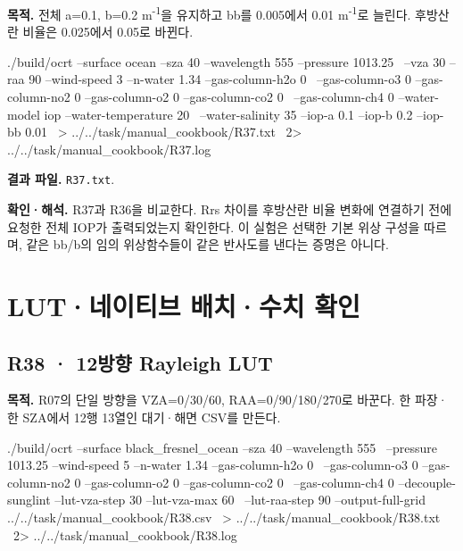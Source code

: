 \label{recipe:R37}

\textbf{목적. }전체 a=0.1, b=0.2 m\textsuperscript{-1}을 유지하고 bb를 0.005에서 0.01 m\textsuperscript{-1}로 늘린다. 후방산란 비율은 0.025에서 0.05로 바뀐다.

\noindent\begin{minipage}{\linewidth}
\begin{ManualCode}

./build/ocrt --surface ocean --sza 40 --wavelength 555 --pressure 1013.25 \
  --vza 30 --raa 90 --wind-speed 3 --n-water 1.34 --gas-column-h2o 0 \
  --gas-column-o3 0 --gas-column-no2 0 --gas-column-o2 0 --gas-column-co2 0 \
  --gas-column-ch4 0 --water-model iop --water-temperature 20 \
  --water-salinity 35 --iop-a 0.1 --iop-b 0.2 --iop-bb 0.01 \
  > ../../task/manual_cookbook/R37.txt \
  2> ../../task/manual_cookbook/R37.log

\end{ManualCode}
\end{minipage}\par

\textbf{결과 파일. }\texttt{R37.txt}.

\textbf{확인·해석. }R37과 R36을 비교한다. Rrs 차이를 후방산란 비율 변화에 연결하기 전에 요청한 전체 IOP가 출력되었는지 확인한다. 이 실험은 선택한 기본 위상 구성을 따르며, 같은 bb/b의 임의 위상함수들이 같은 반사도를 낸다는 증명은 아니다.

\section{LUT·네이티브 배치·수치 확인}
\label{sec:auto:09_cookbook:7}

\Needspace{17\baselineskip}

\subsection{R38 · 12방향 Rayleigh LUT}
\label{sec:auto:09_cookbook:7.1}

\label{recipe:R38}

\textbf{목적. }R07의 단일 방향을 VZA=0/30/60\textdegree{}, RAA=0/90/180/270\textdegree{}로 바꾼다. 한 파장·한 SZA에서 12행 13열인 대기·해면 CSV를 만든다.

\noindent\begin{minipage}{\linewidth}
\begin{ManualCode}

./build/ocrt --surface black_fresnel_ocean --sza 40 --wavelength 555 \
  --pressure 1013.25 --wind-speed 5 --n-water 1.34 --gas-column-h2o 0 \
  --gas-column-o3 0 --gas-column-no2 0 --gas-column-o2 0 --gas-column-co2 0 \
  --gas-column-ch4 0 --decouple-sunglint --lut-vza-step 30 --lut-vza-max 60 \
  --lut-raa-step 90 --output-full-grid ../../task/manual_cookbook/R38.csv \
  > ../../task/manual_cookbook/R38.txt \
  2> ../../task/manual_cookbook/R38.log

\end{ManualCode}
\end{minipage}\par

